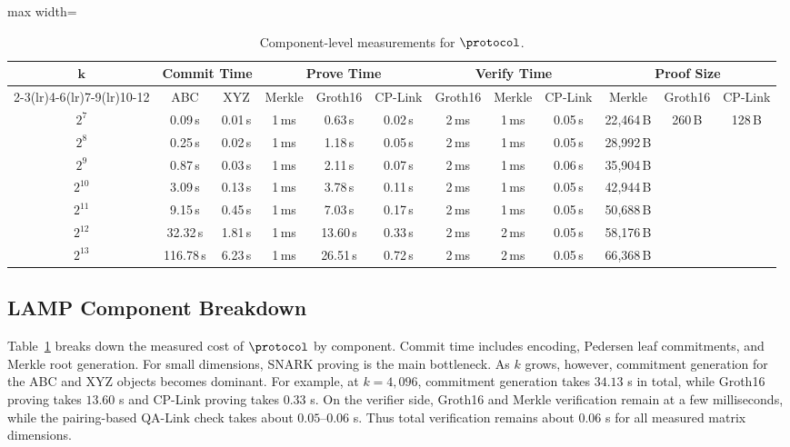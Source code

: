 \begin{table}[!t]
\centering
\setlength{\tabcolsep}{3.5pt}
\begin{adjustbox}{max width=\textwidth}
\begin{tabular}{c cc ccc ccc ccc}
\toprule
\multirow{2}{*}{\(\boldsymbol{k}\)}
& \multicolumn{2}{c}{\textbf{Commit Time}}
& \multicolumn{3}{c}{\textbf{Prove Time}}
& \multicolumn{3}{c}{\textbf{Verify Time}}
& \multicolumn{3}{c}{\textbf{Proof Size}} \\
\cmidrule(lr){2-3}\cmidrule(lr){4-6}\cmidrule(lr){7-9}\cmidrule(lr){10-12}
& ABC & XYZ
& Merkle & Groth16 & CP-Link
& Groth16 & Merkle & CP-Link
& Merkle & Groth16 & CP-Link \\
\midrule
$2^7$    & 0.09\,s    & 0.01\,s & 1\,ms & 0.63\,s  & 0.02\,s & 2\,ms & 1\,ms & 0.05\,s & 22{,}464\,B & \multirow{7}{*}{260\,B} & \multirow{7}{*}{128\,B} \\
$2^8$    & 0.25\,s    & 0.02\,s & 1\,ms & 1.18\,s  & 0.05\,s & 2\,ms & 1\,ms & 0.05\,s & 28{,}992\,B & & \\
$2^9$    & 0.87\,s    & 0.03\,s & 1\,ms & 2.11\,s  & 0.07\,s & 2\,ms & 1\,ms & 0.06\,s & 35{,}904\,B & & \\
$2^{10}$ & 3.09\,s    & 0.13\,s & 1\,ms & 3.78\,s  & 0.11\,s & 2\,ms & 1\,ms & 0.05\,s & 42{,}944\,B & & \\
$2^{11}$ & 9.15\,s    & 0.45\,s & 1\,ms & 7.03\,s  & 0.17\,s & 2\,ms & 1\,ms & 0.05\,s & 50{,}688\,B & & \\
$2^{12}$ & 32.32\,s   & 1.81\,s & 1\,ms & 13.60\,s & 0.33\,s & 2\,ms & 2\,ms & 0.05\,s & 58{,}176\,B & & \\
$2^{13}$ & 116.78\,s  & 6.23\,s & 1\,ms & 26.51\,s & 0.72\,s & 2\,ms & 2\,ms & 0.05\,s & 66{,}368\,B & & \\
\bottomrule
\end{tabular}
\end{adjustbox}
\vspace{6pt}
\caption{Component-level measurements for \(\protocol\).}
\label{tab:lamp-breakdown}
\end{table}

\subsection{LAMP Component Breakdown}
\label{sec:eval-lamp-breakdown}

Table~\ref{tab:lamp-breakdown} breaks down the measured cost of \(\protocol\)
by component.  Commit time includes encoding, Pedersen leaf commitments, and
Merkle root generation.  For small dimensions, SNARK proving is the main bottleneck.
As \(k\) grows, however, commitment generation for the ABC and XYZ objects
becomes dominant.  For example, at \(k=4{,}096\), commitment generation takes
\(34.13\) s in total, while Groth16 proving takes \(13.60\) s and CP-Link
proving takes \(0.33\) s.  On the verifier side, Groth16 and Merkle
verification remain at a few milliseconds, while the pairing-based QA-Link
check takes about \(0.05\)--\(0.06\) s.  Thus total verification remains about \(0.06\) s for all measured matrix dimensions.



